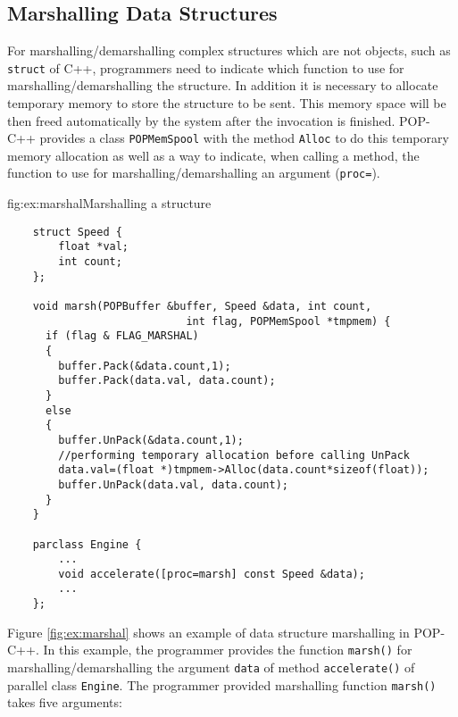 \subsection{Marshalling Data Structures} \label {sbsec:marshallingData}

For marshalling/demarshalling complex structures which are not objects, such as
\texttt{struct} of C++, programmers need to indicate which function to use for
marshalling/demarshalling the structure. In addition it is necessary to
allocate temporary memory to store the structure to be sent. This memory
space will be then freed automatically by the system after the invocation is
finished. POP-C++ provides a class \texttt{POPMemSpool} with the method
\texttt{Alloc} to do this temporary memory allocation as well as a way to
indicate, when calling a method, the function to use for
marshalling/demarshalling an argument (\texttt{proc=}).
  

\begin{figura}{fig:ex:marshal}{Marshalling a structure}%
\vspace{-4mm}%
\begin{verbatim}
    struct Speed {
        float *val;
        int count;
    };

    void marsh(POPBuffer &buffer, Speed &data, int count,
                            int flag, POPMemSpool *tmpmem) {
      if (flag & FLAG_MARSHAL)
      {
        buffer.Pack(&data.count,1);
        buffer.Pack(data.val, data.count);
      }
      else
      {
        buffer.UnPack(&data.count,1);
        //performing temporary allocation before calling UnPack
        data.val=(float *)tmpmem->Alloc(data.count*sizeof(float)); 
        buffer.UnPack(data.val, data.count);
      }
    }

    parclass Engine {
        ...
        void accelerate([proc=marsh] const Speed &data);
        ...
    };
\end{verbatim}
\end{figura}

Figure \ref{fig:ex:marshal} shows an example of data structure marshalling
in POP-C++.  In this example, the programmer provides the function
\texttt{marsh()} for marshalling/demarshalling the argument \texttt{data}
of method \texttt{accelerate()} of parallel class \texttt{Engine}.
The programmer provided marshalling function
\texttt{marsh()} takes five arguments:

